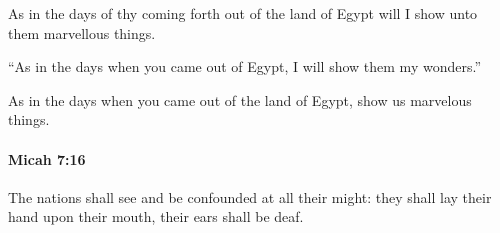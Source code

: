 			\begin{versebox}
					\item[BHS] 
					\item[LXX] 
					\item[ASV] As in the days of thy coming forth out of the land of Egypt will I show unto them marvellous things.
					\item[NIV] “As in the days when you came out of Egypt, I will show them my wonders.”
					\item[NRSV] As in the days when you came out of the land of Egypt, show us marvelous things.
			\end{versebox}

		\paragraph{Micah 7:16} %
			\label{MICAH-7-16}

			The nations shall see and be confounded at all their might: they shall lay their hand upon their mouth, their ears shall be deaf.

